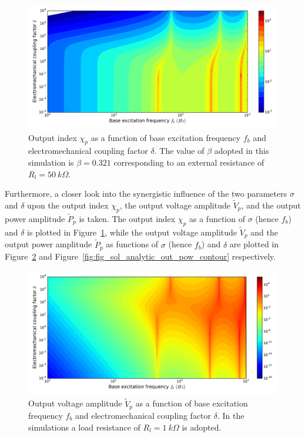 \documentclass{svjour3}                     %
\begin{document}
\begin{figure}[!htbp]
    \centering
    \includegraphics[width=\textwidth]{./img_eig_asy/fig_sol_analytic_out_index_contour}
    \caption{Output index $\chi_p$ as a function of base excitation frequency $f_b$ and electromechanical coupling factor $\delta$. The value of $\beta$ adopted in this simulation is $\beta = 0.321$ corresponding to an external resistance of $R_l = 50\ k\Omega$. }
    \label{fig:fig_sol_analytic_out_index_contour}
\end{figure}

Furthermore, a closer look into the synergistic influence of the two parameters $\sigma$ and $\delta$ upon the output index $\chi_p$, the output voltage amplitude $\tilde{V}_p$, and the output power amplitude $\tilde{P}_p$ is taken. The output index $\chi_p$ as a function of $\sigma$ (hence $f_b$) and $\delta$ is plotted in Figure~\ref{fig:fig_sol_analytic_out_index_contour}, while the output voltage amplitude $\tilde{V}_p$ and the output power amplitude $\tilde{P}_p$ as functions of $\sigma$ (hence $f_b$) and $\delta$ are plotted in Figure~\ref{fig:fig_sol_analytic_out_vol_contour} and Figure~\ref{fig:fig_sol_analytic_out_pow_contour} respectively.

\begin{figure}[!htbp]
    \centering
    \includegraphics[width=\textwidth]{./img_eig_asy/fig_sol_analytic_out_vol_contour}
    \caption{Output voltage amplitude $\tilde{V}_p$ as a function of base excitation frequency $f_b$ and electromechanical coupling factor $\delta$. In the simulations a load resistance of $R_l = 1\ k\Omega$ is adopted.}
    \label{fig:fig_sol_analytic_out_vol_contour}
\end{figure}
\end{document}
